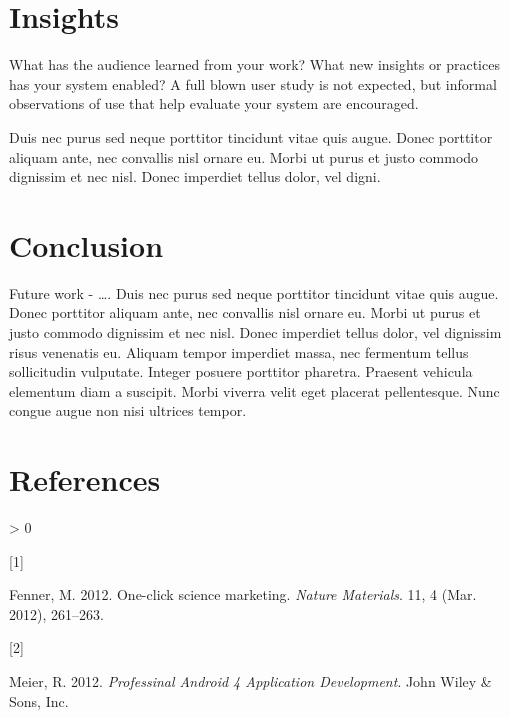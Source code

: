 \documentclass{acm_proc_article-sp}
\newlength{\csllabelwidth}
\newlength{\cslhangindent}
\newenvironment{CSLReferences}[3] %
 {%
  \setlength{\parindent}{0pt}
  \ifodd #1 \everypar{\setlength{\hangindent}{\cslhangindent}}\ignorespaces\fi
  \ifnum #2 > 0
  \setlength{\parskip}{#2\baselineskip}
  \fi
 }%
 {}
\newcommand{\CSLLeftMargin}[1]{\parbox[t]{\csllabelwidth}{#1}}
\newcommand{\CSLRightInline}[1]{\parbox[t]{\linewidth - \csllabelwidth}{#1}}
\begin{document}
\hypertarget{insights}{%
\section{Insights}\label{insights}}

What has the audience learned from your work? What new insights or
practices has your system enabled? A full blown user study is not
expected, but informal observations of use that help evaluate your
system are encouraged.

Duis nec purus sed neque porttitor tincidunt vitae quis augue. Donec
porttitor aliquam ante, nec convallis nisl ornare eu. Morbi ut purus et
justo commodo dignissim et nec nisl. Donec imperdiet tellus dolor, vel
digni.

\hypertarget{conclusion}{%
\section{Conclusion}\label{conclusion}}

Future work - \ldots. Duis nec purus sed neque porttitor tincidunt vitae
quis augue. Donec porttitor aliquam ante, nec convallis nisl ornare eu.
Morbi ut purus et justo commodo dignissim et nec nisl. Donec imperdiet
tellus dolor, vel dignissim risus venenatis eu. Aliquam tempor imperdiet
massa, nec fermentum tellus sollicitudin vulputate. Integer posuere
porttitor pharetra. Praesent vehicula elementum diam a suscipit. Morbi
viverra velit eget placerat pellentesque. Nunc congue augue non nisi
ultrices tempor.

\hypertarget{references}{%
\section*{References}\label{references}}

\hypertarget{refs}{}
\begin{CSLReferences}{0}{0}
\leavevmode\hypertarget{ref-fenner2012a}{}%
\CSLLeftMargin{{[}1{]} }
\CSLRightInline{Fenner, M. 2012. One-click science marketing.
\emph{Nature Materials}. 11, 4 (Mar. 2012), 261--263.}

\leavevmode\hypertarget{ref-meier2012}{}%
\CSLLeftMargin{{[}2{]} }
\CSLRightInline{Meier, R. 2012. \emph{Professinal Android 4 Application
Development}. John Wiley \& Sons, Inc.}

\end{CSLReferences}
\setlength{\parindent}{0in}
\end{document}
